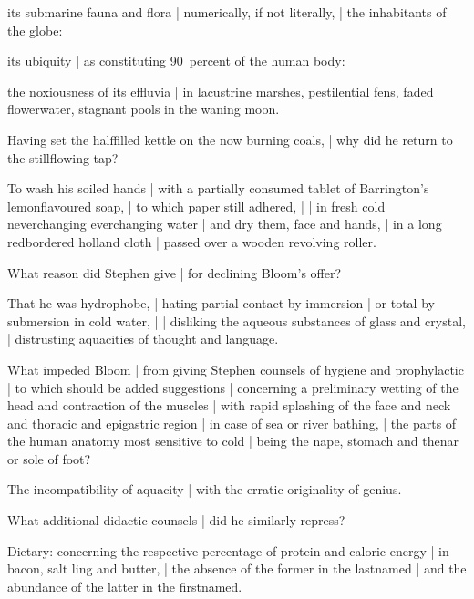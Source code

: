\Philosophy
its submarine fauna and flora
 |
numerically, if not literally, |
the inhabitants of the globe:

\Household
its ubiquity |
as constituting 90~percent of the human body:

\Factual
the noxiousness of its effluvia |
in lacustrine marshes, pestilential fens,
faded flowerwater,
stagnant pools in the waning moon.



Having set the half\/filled kettle on the now burning coals, |
why did he return to the stillflowing tap?%

\Household
To wash his soiled hands |
with a partially consumed tablet of Barrington's lemonflavoured soap, |
to which paper still adhered, |
 |
in fresh cold neverchanging everchanging water |
and dry them,
face and hands, |
in a long redbordered holland cloth |
passed over a wooden revolving roller.



What reason did Stephen give |
for declining Bloom's offer?

\Philosophy
That he was hydrophobe, |
hating partial contact by immersion |
or total by submersion in cold water, |
 |
disliking the aqueous substances of glass and crystal, |
distrusting aquacities of thought and language.



What impeded Bloom |
from giving Stephen counsels of hygiene and prophylactic |
to which should be added suggestions |
concerning a preliminary wetting of the head and contraction of the muscles |
with rapid splashing of the face and neck and thoracic and epigastric region |
in case of sea or river bathing, |
the parts of the human anatomy most sensitive to cold |
being the nape, stomach and thenar or sole of foot?

\Bloom
The incompatibility of aquacity |
with the erratic originality of genius.


What additional didactic counsels |
did he similarly repress?

\Bloom
Dietary:
concerning the respective percentage of protein and caloric energy |
in bacon, salt ling and butter, |
the absence of the former in the lastnamed |
and the abundance of the latter in the firstnamed.


